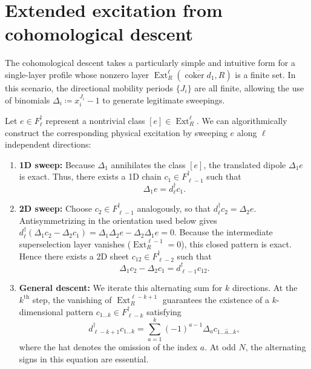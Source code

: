 \documentclass[aps,prx,english,superscriptaddress,twocolumn,tightenlines,showpacs,longbibliography,floatfix,amsfonts]{revtex4-2}
\theoremstyle{remark}
\theoremstyle{definition}
\begin{document}
\appendix

\section{Extended excitation from cohomological descent}
\label{app:cohomological_descent}

The cohomological descent takes a particularly simple and intuitive form for a single-layer profile whose nonzero layer $\operatorname{Ext}_R^\ell (\overline{\operatorname{coker}d_1}, R)$ is a finite set. In this scenario, the directional mobility periods $\{J_i\}$ are all finite, allowing the use of binomials $\Delta_i \coloneqq x_i^{J_i} - 1$ to generate legitimate sweepings.

Let $e \in F_\ell^\dagger$ represent a nontrivial class $[e] \in \operatorname{Ext}_R^\ell$. We can algorithmically construct the corresponding physical excitation by sweeping $e$ along $\ell$ independent directions:
\begin{enumerate}
	\item \textbf{1D sweep:} Because $\Delta_1$ annihilates the class $[e]$, the translated dipole $\Delta_1 e$ is exact. Thus, there exists a 1D chain $c_1 \in F_{\ell-1}^\dagger$ such that
	\begin{equation}
		\Delta_1 e = d_\ell^\dagger c_1.
	\end{equation}

	\item \textbf{2D sweep:} Choose $c_2\in F_{\ell-1}^\dagger$ analogously,
	so that $d_\ell^\dagger c_2=\Delta_2e$. Antisymmetrizing in the
	orientation used below gives
	$d_\ell^\dagger(\Delta_1c_2-\Delta_2c_1)
	=\Delta_1\Delta_2e-\Delta_2\Delta_1e=0$.
	Because the intermediate superselection layer vanishes
	($\operatorname{Ext}_R^{\ell-1}=0$), this closed pattern is exact. Hence
	there exists a 2D sheet $c_{12} \in F_{\ell-2}^\dagger$ such that
	\begin{equation}
		\Delta_1 c_2 - \Delta_2 c_1 = d_{\ell-1}^\dagger c_{12}.
	\end{equation}

	\item \textbf{General descent:} We iterate this alternating sum for $k$ directions. At the $k^{\text{th}}$ step, the vanishing of $\operatorname{Ext}_R^{\ell-k+1}$ guarantees the existence of a $k$-dimensional pattern $c_{1\dots k} \in F_{\ell-k}^\dagger$ satisfying
	\begin{equation}
		d_{\ell-k+1}^\dagger c_{1\dots k} = \sum_{a=1}^k (-1)^{a-1} \Delta_a c_{1\dots \hat{a}\dots k},
	\end{equation}
	where the hat denotes the omission of the index $a$.
	At odd $N$, the alternating signs in this equation are essential.
\end{enumerate}
\end{document}
